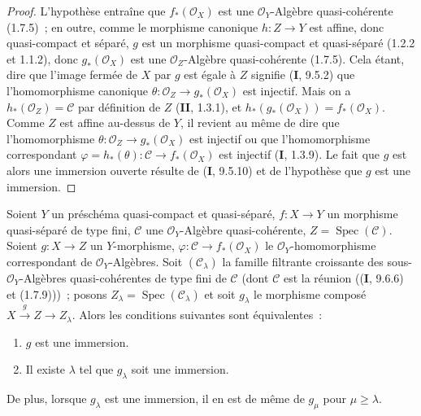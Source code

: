 \begin{proof}
L'hypothèse entraîne que $f_*(\mathcal O_X)$ est une $\mathcal O_Y$-Algèbre
quasi-cohérente (1.7.5)~; en outre, comme le morphisme canonique $h:Z\to Y$
est affine, donc quasi-compact et séparé, $g$ est un
morphisme quasi-compact et quasi-séparé (1.2.2 et 1.1.2), donc $g_*(\mathcal O_X)$ est une
$\mathcal O_Z$-Algèbre quasi-cohérente (1.7.5). Cela étant, dire que l'image
fermée de $X$ par $g$ est égale à $Z$ signifie (\textbf{I}, 9.5.2) que
l'homomorphisme canonique $\theta:\mathcal O_Z\to g_*(\mathcal O_X)$ est
injectif. Mais on a $h_*(\mathcal O_Z)=\mathcal C$ par définition de $Z$
(\textbf{II}, 1.3.1), et $h_*(g_*(\mathcal O_X))=f_*(\mathcal O_X)$. Comme $Z$ est
affine au-dessus de $Y$, il revient au même de dire que l'homomorphisme
$\theta:\mathcal O_Z\to g_*(\mathcal O_X)$ est injectif ou que
l'homomorphisme correspondant
$\varphi=h_*(\theta):\mathcal C\to f_*(\mathcal O_X)$ est injectif
(\textbf{I}, 1.3.9). Le fait que $g$ est alors une immersion ouverte résulte de
(\textbf{I}, 9.5.10) et de l'hypothèse que $g$ est une immersion.
\end{proof}

\begin{lemma}[8.12.2]
\label{IV.8.12.2-fr}
Soient $Y$ un préschéma quasi-compact et quasi-séparé, $f:X\to Y$ un
morphisme quasi-séparé de type fini, $\mathcal C$ une $\mathcal O_Y$-Algèbre
quasi-cohérente, $Z=\operatorname{Spec}(\mathcal C)$. Soient $g:X\to Z$ un
$Y$-morphisme, $\varphi:\mathcal C\to f_*(\mathcal O_X)$ le
$\mathcal O_Y$-homomorphisme correspondant de $\mathcal O_Y$-Algèbres. Soit
$(\mathcal C_\lambda)$ la famille filtrante croissante des sous-$\mathcal O_Y$-Algèbres
quasi-cohérentes de type fini de $\mathcal C$ (dont $\mathcal C$ est la
réunion \textup{((\textbf{I}, 9.6.6)} et \textup{(1.7.9)))}~; posons
$Z_\lambda=\operatorname{Spec}(\mathcal C_\lambda)$ et soit $g_\lambda$ le
morphisme composé $X\xrightarrow{g}Z\to Z_\lambda$. Alors les conditions
suivantes sont équivalentes~:
\begin{enumerate}
\item[\emph{a)}] $g$ est une immersion.
\item[\emph{b)}] Il existe $\lambda$ tel que $g_\lambda$ soit une immersion.
\end{enumerate}

De plus, lorsque $g_\lambda$ est une immersion, il en est de même de $g_\mu$
pour $\mu\geq\lambda$.
\end{lemma}

